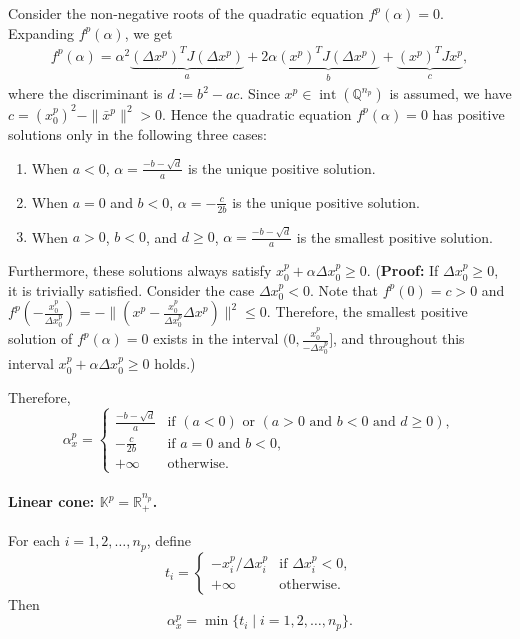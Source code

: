Consider the non-negative roots of the quadratic equation $f^p(\alpha)=0$. 
Expanding $f^p(\alpha)$, we get 
\begin{align*}
    f^p(\alpha) = \alpha^2\underbrace{(\Delta x^p)^T J (\Delta x^p)}_a + 2 \alpha \underbrace{(x^p)^T J (\Delta x^p)}_b + \underbrace{(x^p)^T J x^p}_c,
\end{align*}
where the discriminant is $d:=b^2-ac$.
Since $x^p\in \operatorname{int}(\mathbb{Q}^{n_p})$ is assumed, we have $c = (x^p_0)^2 - \|\bar{x}^p\|^2 > 0$.
Hence the quadratic equation $f^p(\alpha) = 0$ has positive solutions only in the following three cases:
\begin{enumerate}
    \item When $a<0$, $\alpha=\frac{-b-\sqrt{d}}{a}$ is the unique positive solution.
    \item When $a=0$ and $b<0$, $\alpha=-\frac{c}{2b}$ is the unique positive solution.
    \item When $a>0$, $b<0$, and $d\geq 0$, $\alpha=\frac{-b-\sqrt{d}}{a}$ is the smallest positive solution.
\end{enumerate}
Furthermore, these solutions always satisfy $x^p_0+\alpha \Delta x^p_0\geq 0$.
(\textbf{Proof:} If $\Delta x^p_0 \geq 0$, it is trivially satisfied. 
Consider the case $\Delta x^p_0 < 0$. 
Note that $f^p(0)=c>0$ and $f^p(-\frac{x^p_0}{\Delta x^p_0}) = - \|(x^p -\frac{x^p_0}{\Delta x^p_0} \Delta x^p)\|^2 \leq 0$.
Therefore, the smallest positive solution of $f^p(\alpha) = 0$ exists in the interval $\big(0, \frac{x^p_0}{-\Delta x^p_0}\big]$, 
and throughout this interval $x^p_0+\alpha \Delta x^p_0\geq 0$ holds.)

Therefore,
\begin{equation*}
    \alpha^p_x = \begin{cases}
       \frac{-b - \sqrt{d}}{a} & \text{if } (a < 0) \text{ or } (a > 0 \text{ and } b < 0 \text{ and } d \geq 0),\\
       -\frac{c}{2b} & \text{if } a = 0 \text{ and } b < 0,\\
       +\infty & \text{otherwise}.
    \end{cases}
\end{equation*}

\paragraph{Linear cone: $\mathbb{K}^p = \mathbb{R}^{n_p}_+$.}
For each $i = 1, 2, \ldots, n_p$, define
\[
t_i = \begin{cases}
    -x^p_i / \Delta x^p_i & \text{if } \Delta x^p_i < 0, \\
    +\infty & \text{otherwise}.
\end{cases}
\]
Then
\[
    \alpha^p_x = \min\{t_i \mid i = 1, 2, \ldots, n_p\}.
\]

